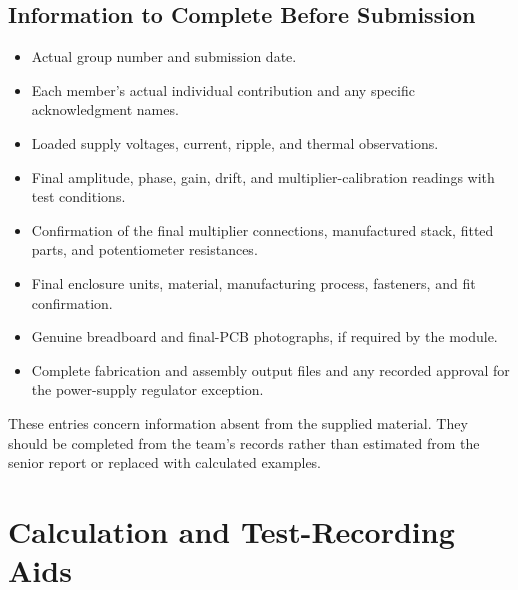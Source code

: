 \documentclass[11pt,a4paper]{article}
\begin{document}
\subsection{Information to Complete Before Submission}
\begin{itemize}
\item Actual group number and submission date.
\item Each member's actual individual contribution and any specific acknowledgment names.
\item Loaded supply voltages, current, ripple, and thermal observations.
\item Final amplitude, phase, gain, drift, and multiplier-calibration readings with test conditions.
\item Confirmation of the final multiplier connections, manufactured stack, fitted parts, and potentiometer resistances.
\item Final enclosure units, material, manufacturing process, fasteners, and fit confirmation.
\item Genuine breadboard and final-PCB photographs, if required by the module.
\item Complete fabrication and assembly output files and any recorded approval for the power-supply regulator exception.
\end{itemize}
These entries concern information absent from the supplied material. They should be completed from the team's records rather than estimated from the senior report or replaced with calculated examples.

\clearpage
\section{Calculation and Test-Recording Aids}
\end{document}
